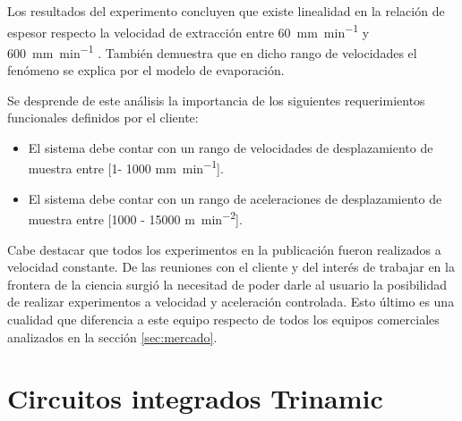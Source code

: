 

Los resultados del experimento concluyen que existe linealidad  en la relación de espesor respecto la velocidad de extracción entre \SI{60}{\milli\meter\per\minute} y \SI{600}{\milli\meter\per\minute} . También demuestra que en dicho rango de velocidades el fenómeno se explica por el modelo de evaporación.

Se desprende de este análisis la importancia de los siguientes requerimientos funcionales definidos por el cliente: 

\begin{itemize}
\item El sistema debe contar con un rango de velocidades de desplazamiento de muestra entre [1- 1000 \si{\milli\meter\per\minute}]. 
\item El sistema debe contar con un rango de aceleraciones de desplazamiento de muestra entre [1000 - 15000 \si{\meter\per\square\minute}].
		
\end{itemize}
	
Cabe destacar que todos los experimentos en la publicación fueron realizados a velocidad constante. De las reuniones con el cliente y del interés de trabajar en la frontera de la ciencia surgió la necesitad de poder darle al usuario la posibilidad de realizar experimentos a velocidad y aceleración controlada. Esto último es una cualidad que diferencia a este equipo respecto de todos los equipos comerciales analizados en la sección \ref{sec:mercado}.

 


\section{Circuitos integrados Trinamic}

